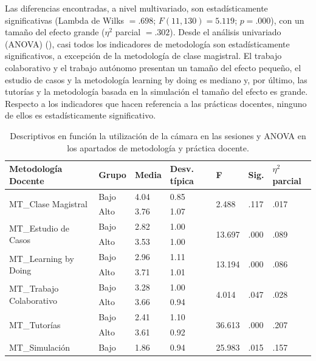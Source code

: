 \documentclass[spanish]{textolivre}
\begin{document}
Las diferencias encontradas, a nivel multivariado, son estadísticamente significativas (Lambda de Wilks $=.698$; $F(11, 130)=5.119$; $p=.000$), con un tamaño del efecto grande ($\eta^2$ parcial $=.302$). Desde el análisis univariado (ANOVA) (), casi todos los indicadores de metodología son estadísticamente significativos, a excepción de la metodología de clase magistral. El trabajo colaborativo y el trabajo autónomo presentan un tamaño del efecto pequeño, el estudio de casos y la metodología learning by doing es mediano y, por último, las tutorías y la metodología basada en la simulación el tamaño del efecto es grande. Respecto a los indicadores que hacen referencia a las prácticas docentes, ninguno de ellos es estadísticamente significativo.

\begin{table}[h]
    \centering
    \begin{threeparttable}
    \caption{Descriptivos en función la utilización de la cámara en las sesiones y ANOVA en los apartados de metodología y práctica docente.}
    \label{tab05}
    \begin{tabular}{*{7}{l}}
    \toprule
    Metodología Docente & Grupo & Media & Desv. típica & F & Sig. & $\eta^2$ parcial \\
    \midrule
    \multirow{2}{*}{MT\_Clase Magistral} & Bajo & 4.04 & 0.85 & \multirow{2}{*}{2.488} & \multirow{2}{*}{.117} & \multirow{2}{*}{.017} \\
    & Alto & 3.76 & 1.07 & & & \\
    \multirow{2}{*}{MT\_Estudio de Casos} & Bajo & 2.82 & 1.00 & \multirow{2}{*}{13.697} & \multirow{2}{*}{.000} & \multirow{2}{*}{.089} \\
    & Alto & 3.53 & 1.00 & & & \\
    \multirow{2}{*}{MT\_Learning by Doing} & Bajo & 2.96 & 1.11 & \multirow{2}{*}{13.194} &  \multirow{2}{*}{.000} & \multirow{2}{*}{.086} \\
    & Alto & 3.71 & 1.01 & & & \\
    \multirow{2}{*}{MT\_Trabajo Colaborativo} & Bajo & 3.28 & 1.00 & \multirow{2}{*}{4.014} & \multirow{2}{*}{.047} & \multirow{2}{*}{.028} \\
    & Alto & 3.66 & 0.94 & & & \\
    \multirow{2}{*}{MT\_Tutorías} & Bajo & 2.41 & 1.10 & \multirow{2}{*}{36.613} & \multirow{2}{*}{.000} & \multirow{2}{*}{.207} \\
    & Alto & 3.61 & 0.92 & & & \\
    \multirow{2}{*}{MT\_Simulación} & Bajo & 1.86 & 0.94 & \multirow{2}{*}{25.983} & \multirow{2}{*}{.015} & \multirow{2}{*}{.157} \\

\end{tabular}
\end{threeparttable}
\end{table}
\end{document}
